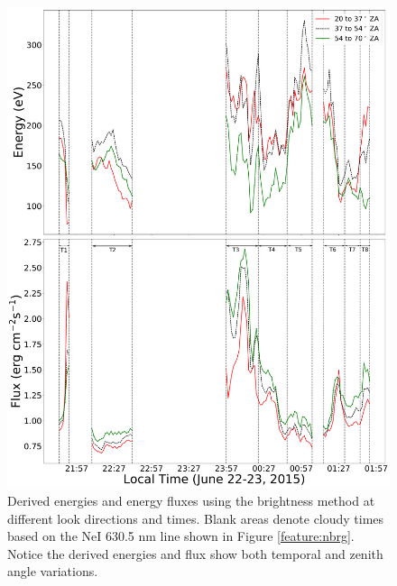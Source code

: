 \begin{figure}
	\centering\includegraphics[width=30pc]{different_ld_m1_e_fl.pdf}
	\caption{Derived energies and energy fluxes using the brightness method at different look directions and times. Blank areas denote cloudy times based on the NeI 630.5 nm line shown in Figure \ref{feature:nbrg}. Notice the derived energies and flux show both temporal and zenith angle variations.}
	\label{fig:e_fl_la}
\end{figure}
